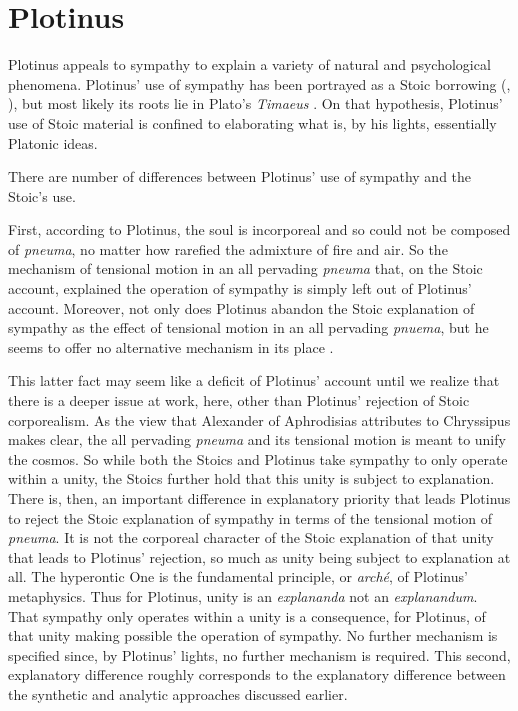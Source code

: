 
\section{Plotinus} %
\label{sec:plotinus}

Plotinus appeals to sympathy to explain a variety of natural and psychological phenomena. Plotinus' use of sympathy has been portrayed as a Stoic borrowing (\citealt[chapter 3]{Emilsson:1988uq}, \citealt{Ierodiakonou:2006gf}), but most likely its roots lie in Plato's \emph{Timaeus} \citep{Emilsson:2015wf}. On that hypothesis, Plotinus' use of Stoic material is confined to elaborating what is, by his lights, essentially Platonic ideas.

There are number of differences between Plotinus' use of sympathy and the Stoic's use.

First, according to Plotinus, the soul is incorporeal and so could not be composed of \emph{pneuma}, no matter how rarefied the admixture of fire and air. So the mechanism of tensional motion in an all pervading \emph{pneuma} that, on the Stoic account, explained the operation of sympathy is simply left out of Plotinus' account. Moreover, not only does Plotinus abandon the Stoic explanation of sympathy as the effect of tensional motion in an all pervading \emph{pnuema}, but he seems to offer no alternative mechanism in its place \citep[48]{Emilsson:1988uq}.

This latter fact may seem like a deficit of Plotinus' account until we realize that there is a deeper issue at work, here, other than Plotinus' rejection of Stoic corporealism. As the view that Alexander of Aphrodisias attributes to Chryssipus makes clear, the all pervading \emph{pneuma} and its tensional motion is meant to unify the cosmos. So while both the Stoics and Plotinus take sympathy to only operate within a unity, the Stoics further hold that this unity is subject to explanation. There is, then, an important difference in explanatory priority that leads Plotinus to reject the Stoic explanation of sympathy in terms of the tensional motion of \emph{pneuma}. It is not the corporeal character of the Stoic explanation of that unity that leads to Plotinus' rejection, so much as unity being subject to explanation at all. The hyperontic One is the fundamental principle, or \emph{arch\'{e}}, of Plotinus' metaphysics. Thus for Plotinus, unity is an \emph{explananda} not an \emph{explanandum}. That sympathy only operates within a unity is a consequence, for Plotinus, of that unity making possible the operation of sympathy. No further mechanism is specified since, by Plotinus' lights, no further mechanism is required. This second, explanatory difference roughly corresponds to the explanatory difference between the synthetic and analytic approaches discussed earlier.

